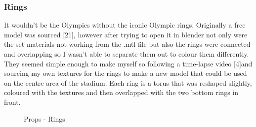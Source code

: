 \documentclass[a4 paper, 12pt]{article}
\begin{document}
\subsubsection{Rings}
It wouldn't be the Olympics without the iconic Olympic rings. Originally a free model was sourced [21], however after trying to open it in blender not only were the set materials not working from the .mtl file but also the rings were connected and overlapping so I wasn't able to separate them out to colour them differently. They seemed simple enough to make myself so following a time-lapse video [4]and sourcing my own textures for the rings to make a new model that could be used on the centre area of the stadium. Each ring is a torus that was reshaped slightly, coloured with the textures and then overlapped with the two bottom rings in front. 
    \begin{figure} [H]
        \caption{Props - Rings}   
    \end{figure}
\end{document}
